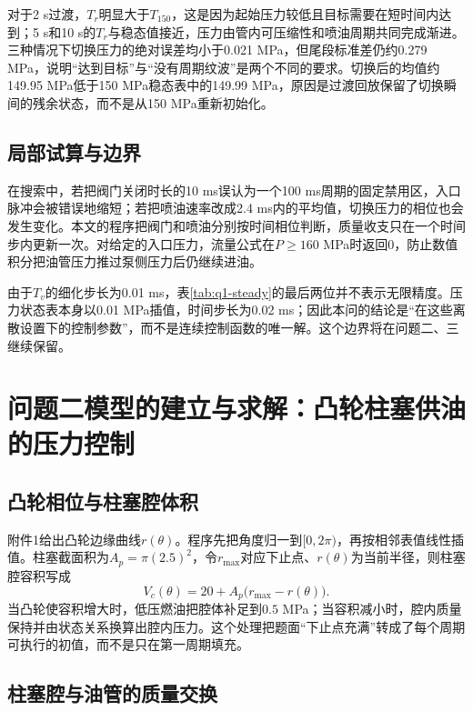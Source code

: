 \documentclass[UTF8,11pt,a4paper]{ctexart}
\begin{document}
对于2 s过渡，$T_r$明显大于$T_{150}$，这是因为起始压力较低且目标需要在短时间内达到；5 s和10 s的$T_r$与稳态值接近，压力由管内可压缩性和喷油周期共同完成渐进。三种情况下切换压力的绝对误差均小于0.021 MPa，但尾段标准差仍约0.279 MPa，说明“达到目标”与“没有周期纹波”是两个不同的要求。切换后的均值约149.95 MPa低于150 MPa稳态表中的149.99 MPa，原因是过渡回放保留了切换瞬间的残余状态，而不是从150 MPa重新初始化。

\subsection{局部试算与边界}

在搜索中，若把阀门关闭时长的10 ms误认为一个100 ms周期的固定禁用区，入口脉冲会被错误地缩短；若把喷油速率改成2.4 ms内的平均值，切换压力的相位也会发生变化。本文的程序把阀门和喷油分别按时间相位判断，质量收支只在一个时间步内更新一次。对给定的入口压力，流量公式在$P\geq160$ MPa时返回0，防止数值积分把油管压力推过泵侧压力后仍继续进油。

由于$T_v$的细化步长为0.01 ms，表\ref{tab:q1-steady}的最后两位并不表示无限精度。压力状态表本身以0.01 MPa插值，时间步长为0.02 ms；因此本问的结论是“在这些离散设置下的控制参数”，而不是连续控制函数的唯一解。这个边界将在问题二、三继续保留。

\label{mcm-q1-end}

\section{问题二模型的建立与求解：凸轮柱塞供油的压力控制}
\label{mcm-q2-start}

\subsection{凸轮相位与柱塞腔体积}

附件1给出凸轮边缘曲线$r(\theta)$。程序先把角度归一到$[0,2\pi)$，再按相邻表值线性插值。柱塞截面积为$A_p=\pi(2.5)^2$，令$r_{\max}$对应下止点、$r(\theta)$为当前半径，则柱塞腔容积写成
\begin{equation}
V_c(\theta)=20+A_p\bigl(r_{\max}-r(\theta)\bigr).
\label{eq:chamber-volume}
\end{equation}
当凸轮使容积增大时，低压燃油把腔体补足到$0.5$ MPa；当容积减小时，腔内质量保持并由状态关系换算出腔内压力。这个处理把题面“下止点充满”转成了每个周期可执行的初值，而不是只在第一周期填充。

\subsection{柱塞腔与油管的质量交换}
\end{document}
